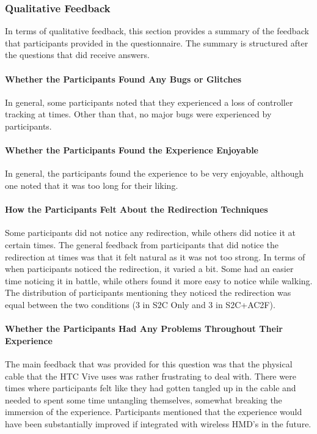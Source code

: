 \subsubsection{Qualitative Feedback}
In terms of qualitative feedback, this section provides a summary of the feedback that participants provided in the questionnaire. The summary is structured after the questions that did receive answers.

\paragraph{Whether the Participants Found Any Bugs or Glitches}
In general, some participants noted that they experienced a loss of controller tracking at times. Other than that, no major bugs were experienced by participants.

\paragraph{Whether the Participants Found the Experience Enjoyable}
In general, the participants found the experience to be very enjoyable, although one noted that it was too long for their liking. 

\paragraph{How the Participants Felt About the Redirection Techniques}
Some participants did not notice any redirection, while others did notice it at certain times. The general feedback from participants that did notice the redirection at times was that it felt natural as it was not too strong. In terms of when participants noticed the redirection, it varied a bit. Some had an easier time noticing it in battle, while others found it more easy to notice while walking. The distribution of participants mentioning they noticed the redirection was equal between the two conditions (3 in S2C Only and 3 in S2C+AC2F). 

\paragraph{Whether the Participants Had Any Problems Throughout Their Experience}
The main feedback that was provided for this question was that the physical cable that the HTC Vive uses was rather frustrating to deal with. There were times where participants felt like they had gotten tangled up in the cable and needed to spent some time untangling themselves, somewhat breaking the immersion of the experience. Participants mentioned that the experience would have been substantially improved if integrated with wireless HMD's in the future. 

